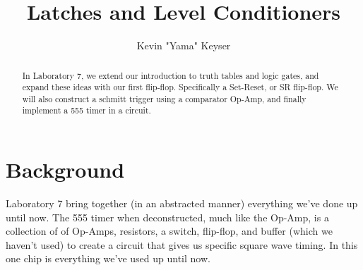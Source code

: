 \documentclass[%
 aip,
 jmp,
 amsmath,
 amssymb,
 reprint,%
 numerical,
 longbibliography,
]{revtex4-1}
\begin{document}

\title[Laboratory 7]{Latches and Level Conditioners} %

\author{Kevin "Yama" Keyser}
%


\begin{abstract}

In Laboratory 7, we extend our introduction to truth tables and logic gates,
and expand these ideas with our first flip-flop. Specifically a Set-Reset, or
SR flip-flop. We will also construct a schmitt trigger using a comparator Op-Amp,
and finally implement a 555 timer in a circuit.

\end{abstract}

\maketitle

%

\section{Background}

Laboratory 7 bring together (in an abstracted manner) everything we've done up until now. The 555
timer when deconstructed, much like the Op-Amp, is a collection of of Op-Amps, resistors, a switch,
flip-flop, and buffer (which we haven't used) to create a circuit that gives us specific square wave
timing. In this one chip is everything we've used up until now. 
\end{document}
